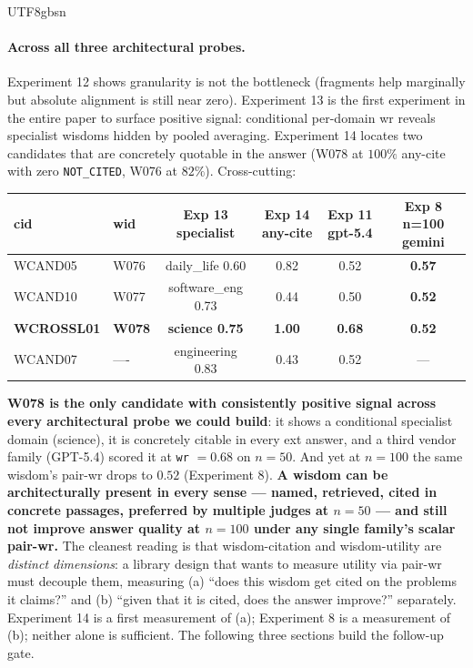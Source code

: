 \documentclass{article}
\begin{document}
\begin{CJK*}{UTF8}{gbsn}
\paragraph{Across all three architectural probes.}
Experiment 12 shows granularity is not the bottleneck
(fragments help marginally but absolute alignment is still
near zero). Experiment 13 is the first experiment in the
entire paper to surface positive signal: conditional
per-domain wr reveals specialist wisdoms hidden by pooled
averaging. Experiment 14 locates two candidates that are
concretely quotable in the answer (W078 at \(100\%\) any-cite
with zero \texttt{NOT\_CITED}, W076 at \(82\%\)). Cross-cutting:

\begin{center}\small
\begin{tabular}{l l c c c c}
  \toprule
  cid & wid & Exp 13 specialist & Exp 14 any-cite & Exp 11 gpt-5.4
    & Exp 8 n{=}100 gemini \\
  \midrule
  WCAND05 & W076 & daily\_life 0.60 & 0.82 & 0.52 & \textbf{0.57} \\
  WCAND10 & W077 & software\_eng 0.73 & 0.44 & 0.50 & \textbf{0.52} \\
  \textbf{WCROSSL01} & \textbf{W078} & \textbf{science 0.75} & \textbf{1.00}
    & \textbf{0.68} & \textbf{0.52} \\
  WCAND07 & ---- & engineering 0.83 & 0.43 & 0.52 & — \\
  \bottomrule
\end{tabular}
\end{center}

\textbf{W078 is the only candidate with consistently positive
signal across every architectural probe we could build}: it
shows a conditional specialist domain (science), it is
concretely citable in every ext answer, and a third vendor
family (GPT-5.4) scored it at \texttt{wr} \(= 0.68\) on
\(n = 50\). And yet at \(n = 100\) the same wisdom's pair-wr
drops to \(0.52\) (Experiment 8). \textbf{A wisdom can be
architecturally present in every sense — named, retrieved,
cited in concrete passages, preferred by multiple judges at
\(n = 50\) — and still not improve answer quality at
\(n = 100\) under any single family's scalar pair-wr.} The
cleanest reading is that wisdom-citation and wisdom-utility
are \emph{distinct dimensions}: a library design that wants to
measure utility via pair-wr must decouple them, measuring (a)
``does this wisdom get cited on the problems it claims?'' and
(b) ``given that it is cited, does the answer improve?''
separately. Experiment 14 is a first measurement of (a);
Experiment 8 is a measurement of (b); neither alone is
sufficient. The following three sections build the
follow-up gate.


\end{CJK*}
\end{document}
